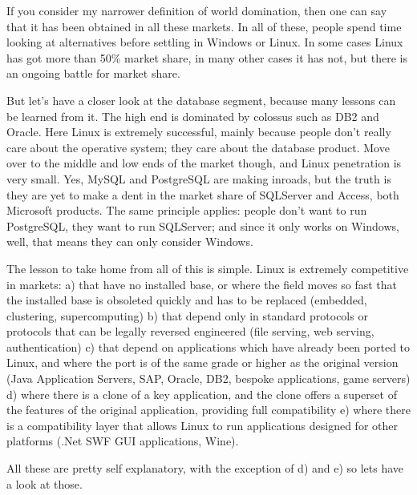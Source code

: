 \documentclass{book}
\begin{document}
If you consider my narrower definition of world domination, then one
can say that it has been obtained in all these markets. In all of
these, people spend time looking at alternatives before settling in
Windows or Linux. In some cases Linux has got more than 50\% market
share, in many other cases it has not, but there is an ongoing battle
for market share.

But let's have a closer look at the database segment, because many
lessons can be learned from it. The high end is dominated by colossus
such as DB2 and Oracle. Here Linux is extremely successful, mainly
because people don't really care about the operative system; they care
about the database product. Move over to the middle and low ends of
the market though, and Linux penetration is very small. Yes, MySQL and
PostgreSQL are making inroads, but the truth is they are yet to make a
dent in the market share of SQLServer and Access, both Microsoft
products. The same principle applies: people don't want to run
PostgreSQL, they want to run SQLServer; and since it only works on
Windows, well, that means they can only consider Windows.

The lesson to take home from all of this is simple. Linux is extremely
competitive in markets: a) that have no installed base, or where the
field moves so fast that the installed base is obsoleted quickly and
has to be replaced (embedded, clustering, supercomputing) b) that
depend only in standard protocols or protocols that can be legally
reversed engineered (file serving, web serving, authentication) c)
that depend on applications which have already been ported to Linux,
and where the port is of the same grade or higher as the original
version (Java Application Servers, SAP, Oracle, DB2, bespoke
applications, game servers) d) where there is a clone of a key
application, and the clone offers a superset of the features of the
original application, providing full compatibility e) where there is a
compatibility layer that allows Linux to run applications designed for
other platforms (.Net SWF GUI applications, Wine).

All these are pretty self explanatory, with the exception of d) and e)
so lets have a look at those.
\end{document}
